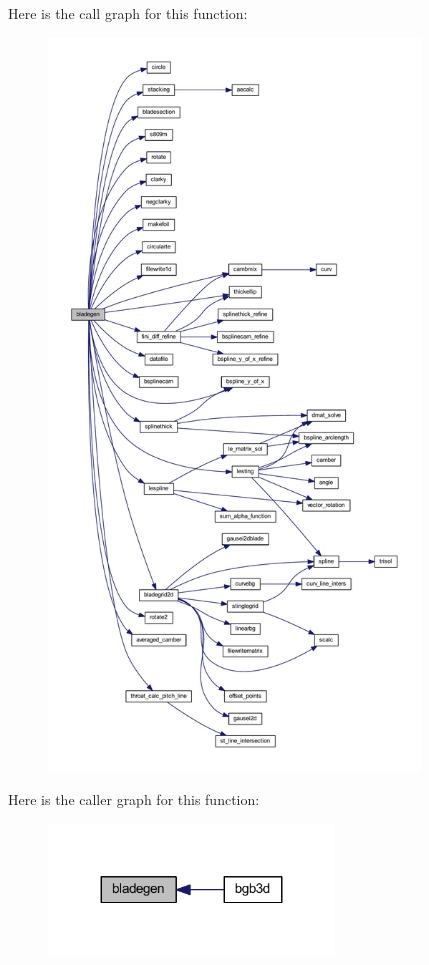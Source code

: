 Here is the call graph for this function\+:
\nopagebreak
\begin{figure}[H]
\begin{center}
\leavevmode
\includegraphics[height=550pt]{bladegen_8f90_abe1d53034e73a0fd4caf61124de7e6eb_cgraph}
\end{center}
\end{figure}




Here is the caller graph for this function\+:
\nopagebreak
\begin{figure}[H]
\begin{center}
\leavevmode
\includegraphics[width=215pt]{bladegen_8f90_abe1d53034e73a0fd4caf61124de7e6eb_icgraph}
\end{center}
\end{figure}


